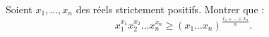Soient $x_1, \ldots, x_n$ des réels strictement positifs. Montrer que :
\[
x_1^{x_1}x_2^{x_2}\ldots x_n^{x_n} \geq (x_1\ldots x_n)^{\frac{x_1+\cdots+x_n}{n}}.
\]

